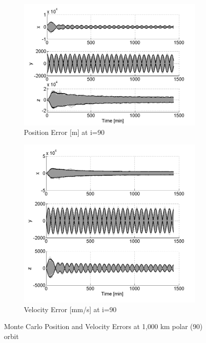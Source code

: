\documentclass[]{aiaa-tc}%
\begin{document}
%
\begin{figure}[h!]
\centering
\begin{subfigure}{.49\textwidth}
  \centering
  \includegraphics{MC_pos90}
  \caption{Position Error [m] at i=90\degree}
  \label{fig:mcpos90}
\end{subfigure}%
\begin{subfigure}{.49\textwidth} 
  \centering
  \includegraphics{MC_vel90}
  \caption{Velocity Error [mm/s] at i=90\degree}
  \label{fig:mcvel90}
\end{subfigure}
\caption{Monte Carlo Position and Velocity Errors at 1,000 km polar (90\degree) orbit}
\label{fig:mc90}
\end{figure}
\end{document}
